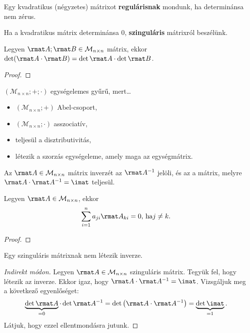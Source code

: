 \begin{definition}
  Egy kvadratikus (négyzetes) mátrixot \textbf{regulárisnak} mondunk, ha
  determinánsa nem zérus.

  Ha a kvadratikus mátrix determinánsa 0, \textbf{szinguláris} mátrixról
  beszélünk.
\end{definition}

\begin{theorem}
  Legyen $\rmat A; \rmat B \in \mathcal M_{n \times n}$ mátrix, ekkor
  $\det(\rmat A \cdot \rmat B) = \det \rmat A \cdot \det \rmat B$.

  \begin{proof}
    \vspace{8em}
  \end{proof}
\end{theorem}

\begin{statement}
  $(\mathcal M_{n \times n}; +; \cdot)$ egységelemes gyűrű, mert\dots
  \begin{itemize}
    \item  $(\mathcal M_{n \times n}; +)$ Abel-csoport,
    \item $(\mathcal M_{n \times n}; \cdot)$ asszociatív,
    \item teljesül a disztributivitás,
    \item létezik a szorzás egységeleme, amely maga az egységmátrix.
  \end{itemize}
\end{statement}

\begin{definition}
  Az $\rmat A \in \mathcal M_{n \times n}$ mátrix inverzét az $\rmat A^{-1}$
  jelöli, és az a mátrix, melyre $\rmat A \cdot \rmat A^{-1} = \imat$
  teljesül.
\end{definition}

\begin{theorem}
  Legyen $\rmat A \in \mathcal M_{n \times n}$, ekkor
  $$
    \sum_{i=1}^{n} a_{ji} \rmat A_{ki} = 0
    \text{, ha}
    j \neq k
    \text.
  $$

  \begin{proof}
    \vspace{6em}
  \end{proof}
\end{theorem}

\begin{statement}
  Egy szinguláris mátrixnak nem létezik inverze.

  \begin{proof}[Indirekt módon]
    Legyen $\rmat A \in \mathcal M_{n \times n}$ szinguláris mátrix. Tegyük fel,
    hogy létezik az inverze. Ekkor igaz, hogy
    $\rmat A \cdot \rmat A^{-1} = \imat$.
    Vizsgáljuk meg a következő egyenlőséget:
    $$
      \underbrace{\det \rmat A}_{=0} \cdot \det \rmat A^{-1}
      = \det \left( \rmat A \cdot \rmat A^{-1} \right)
      = \underbrace{\det \imat}_{=1}
      \text.
    $$
    Látjuk, hogy ezzel ellentmondásra jutunk.
  \end{proof}
\end{statement}

